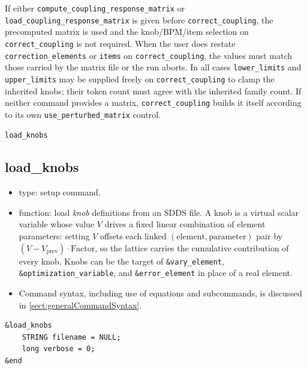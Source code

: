 \documentclass[11pt]{article}
\begin{document}
If either \verb|compute_coupling_response_matrix| or
\verb|load_coupling_response_matrix| is given before
\verb|correct_coupling|, the precomputed matrix is used and the
knob/BPM/item selection on \verb|correct_coupling| is not required.
When the user does restate \verb|correction_elements| or \verb|items|
on \verb|correct_coupling|, the values must match those carried by the
matrix file or the run aborts.  In all cases \verb|lower_limits| and
\verb|upper_limits| may be supplied freely on \verb|correct_coupling|
to clamp the inherited knobs; their token count must agree with the
inherited family count.  If neither command provides a matrix,
\verb|correct_coupling| builds it itself according to its own
\verb|use_perturbed_matrix| control.

\newpage
\begin{center}{\Large\verb|load_knobs|}\end{center}
\subsection{load\_knobs \label{subsec:loadknobs}}

\begin{itemize}
\item type: setup command.
\item function: load \emph{knob} definitions from an SDDS file.  A knob is
        a virtual scalar variable whose value $V$ drives a fixed
        linear combination of element parameters: setting $V$ offsets
        each linked $(\textrm{element},\textrm{parameter})$ pair by
        $(V - V_{\textrm{prev}}) \cdot \textrm{Factor}$, so the lattice
        carries the cumulative contribution of every knob.  Knobs can
        be the target of \verb|&vary_element|,
        \verb|&optimization_variable|, and \verb|&error_element| in
        place of a real element.
\item Command syntax, including use of equations and subcommands, is
        discussed in \ref{sect:generalCommandSyntax}.
\end{itemize}

\begin{verbatim}
&load_knobs
    STRING filename = NULL;
    long verbose = 0;
&end
\end{verbatim}
\end{document}
